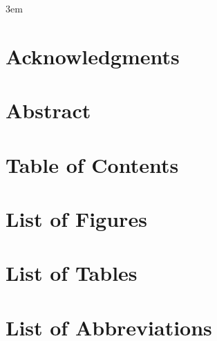 \documentclass[10pt,twoside]{book}
\begin{document}
\emergencystretch 3em

\frontmatter



\chapter{Acknowledgments}

\clearpage

\chapter{Abstract}

\clearpage

\chapter{Table of Contents}
\tableofcontents %
\clearpage

\chapter{List of Figures}
\listoffigures
\clearpage

\chapter{List of Tables}
\listoftables
\clearpage

\chapter{List of Abbreviations}

\clearpage



% 


% 

\end{document}
